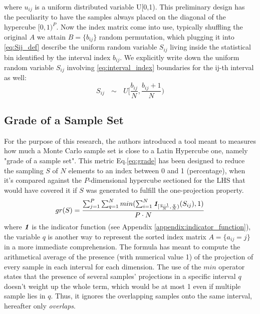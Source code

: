 \documentclass{article}
\newcommand{\meqref}[1]{Eq.\ref{#1}}
\newcommand{\mappendixref}[1]{Appendix \ref{#1}}
\newcommand{\indfunc}[1]{\textit{\textbf{1}}_{#1}}
\begin{document}
where $u_{ij}$ is a uniform distributed variable U[0,1). This preliminary design has the peculiarity to have the samples always placed on the diagonal of the hypercube $[0,1)^P$. Now the index matrix come into use, typically shuffling the original $A$ we attain $B = \{b_{ij}\}$ random permutation, which plugging it  into \cref{eq:Sij_def} describe the uniform random variable $S_{ij}$ living inside the statistical bin identified by the interval index $b_{ij}$. We explicitly write down the uniform random variable $S_{ij}$ involving \cref{eq:interval_index} boundaries for the ij-th interval as well: 
\begin{equation}
\label{eq:rand_variable_Sij}
S_{ij} \text{ $\sim$ } U[\frac{b_{ij}}{N}, \frac{b_{ij} + 1}{N})
\end{equation}

\subsection{Grade of a Sample Set}
\label{subsec:lhs_grade}
For the purpose of this research, the authors introduced a tool meant to measures how much a Monte Carlo sample set is close to a Latin Hypercube one, namely "grade of a sample set". This metric \meqref{eq:grade} has been designed to reduce the sampling $S$ of $N$ elements to an index between 0 and 1 (percentage), when it's compared against the $P$-dimensional hypercube sectioned for the LHS that would have covered it if $S$ was generated to fulfill the one-projection property.
\begin{equation}
\label{eq:grade}
gr(S) = \frac{\sum^P_{j=1}\sum^N_{q=1} min(\sum^N_{i=1}\indfunc{[\frac{q-1}{N}, \frac{q}{N})}(S_{ij}), 1)}{P \cdot N}
\end{equation}
where $\indfunc{}$ is the indicator function (see \mappendixref{appendix:indicator_function}), the variable $q$ is another way to represent the sorted index matrix $A = \{a_{ij} = j \}$ in a more immediate comprehension. The formula has meant to compute the arithmetical average of the presence (with numerical value 1) of the projection of every sample in each interval for each dimension. The use of the $min$ operator states that the presence of several samples' projections in a specific interval $q$ doesn't weight up the whole term, which would be at most 1 even if multiple sample lies in $q$. Thus, it ignores the overlapping samples onto the same interval, hereafter only \textit{overlaps}.
\end{document}
